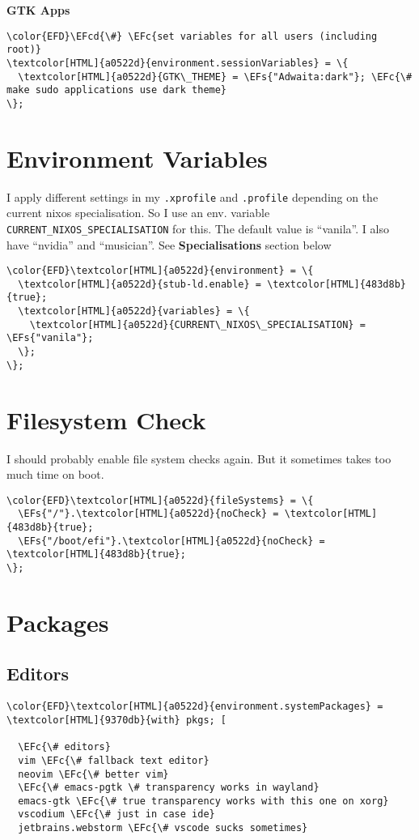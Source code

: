 \documentclass[14pt]{article}
\newcommand{\EFc}[1]{\textcolor{EFc}{#1}} %
\newcommand{\EFcd}[1]{\textcolor{EFcd}{#1}} %
\newcommand{\EFs}[1]{\textcolor{EFs}{#1}} %
\begin{document}
\textbf{GTK Apps}
\begin{Code}
\begin{Verbatim}
\color{EFD}\EFcd{\#} \EFc{set variables for all users (including root)}
\textcolor[HTML]{a0522d}{environment.sessionVariables} = \{
  \textcolor[HTML]{a0522d}{GTK\_THEME} = \EFs{"Adwaita:dark"}; \EFc{\# make sudo applications use dark theme}
\};
\end{Verbatim}
\end{Code}
\section{Environment Variables}
\label{sec:org2ff120a}
I apply different settings in my \texttt{.xprofile} and \texttt{.profile} depending on the current nixos specialisation. So I use an env. variable \texttt{CURRENT\_NIXOS\_SPECIALISATION} for this. The default value is ``vanila''. I also have ``nvidia'' and ``musician''. See \textbf{Specialisations} section below

\begin{Code}
\begin{Verbatim}
\color{EFD}\textcolor[HTML]{a0522d}{environment} = \{
  \textcolor[HTML]{a0522d}{stub-ld.enable} = \textcolor[HTML]{483d8b}{true};
  \textcolor[HTML]{a0522d}{variables} = \{
    \textcolor[HTML]{a0522d}{CURRENT\_NIXOS\_SPECIALISATION} = \EFs{"vanila"};
  \};
\};
\end{Verbatim}
\end{Code}
\section{Filesystem Check}
\label{sec:org9ce9025}
I should probably enable file system checks again. But it sometimes takes too much time on boot.
\begin{Code}
\begin{Verbatim}
\color{EFD}\textcolor[HTML]{a0522d}{fileSystems} = \{
  \EFs{"/"}.\textcolor[HTML]{a0522d}{noCheck} = \textcolor[HTML]{483d8b}{true};
  \EFs{"/boot/efi"}.\textcolor[HTML]{a0522d}{noCheck} = \textcolor[HTML]{483d8b}{true};
\};
\end{Verbatim}
\end{Code}
\section{Packages}
\label{sec:org8190a1f}
\subsection{Editors}
\label{sec:orge9b864d}
\begin{Code}
\begin{Verbatim}
\color{EFD}\textcolor[HTML]{a0522d}{environment.systemPackages} = \textcolor[HTML]{9370db}{with} pkgs; [

  \EFc{\# editors}
  vim \EFc{\# fallback text editor}
  neovim \EFc{\# better vim}
  \EFc{\# emacs-pgtk \# transparency works in wayland}
  emacs-gtk \EFc{\# true transparency works with this one on xorg}
  vscodium \EFc{\# just in case ide}
  jetbrains.webstorm \EFc{\# vscode sucks sometimes}
\end{Verbatim}
\end{Code}
\end{document}
